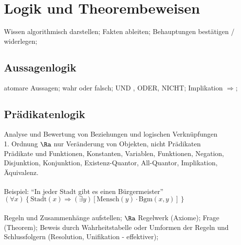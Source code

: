 \documentclass[german,color,6pt]{latex4ei/latex4ei_sheet}
\begin{document}
\columnbreak

\section{Logik und Theorembeweisen}
\begin{symbolbox}
Wissen algorithmisch darstellen; Fakten ableiten; Behauptungen bestätigen / widerlegen;
\end{symbolbox}

\begin{sectionbox}
\subsection{Aussagenlogik}
atomare Aussagen; wahr oder falsch; UND , ODER, NICHT; Implikation $\Rightarrow$;
\end{sectionbox}

\begin{sectionbox}
\subsection{Prädikatenlogik}
Analyse und Bewertung von Beziehungen und logischen Verknüpfungen\\
1. Ordnung $\Ra$ nur Veränderung von Objekten, nicht Prädikaten\\
Prädikate und Funktionen, Konstanten, Variablen, Funktionen, Negation, Disjunktion, Konjunktion, Existenz-Quantor, All-Quantor, Implikation, Äquivalenz.\\\\
Beispiel: "`In jeder Stadt gibt es einen Bürgermeister"' \\
$(\forall x) \left\{ \text{Stadt}(x)  \Rightarrow (\exists y) \left[ \text{Mensch}(y) \cdot \text{Bgm}(x,y) \right] \right\}$\\\\
Regeln und Zusammenhänge aufstellen; $\Ra$ Regelwerk (Axiome); Frage (Theorem); Beweis durch Wahrheitstabelle oder Umformen der Regeln und Schlussfolgern (Resolution, Unifikation - effektiver);
\end{sectionbox}
\end{document}
